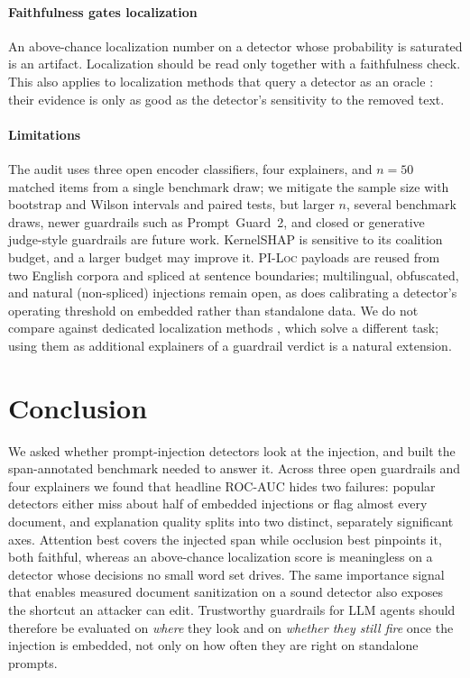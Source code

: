 \documentclass{ieeeaccess}
\begin{document}
\paragraph*{Faithfulness gates localization}
An above-chance localization number on a detector whose probability is saturated is an artifact. Localization should be read only together with a faithfulness check. This also applies to localization methods that query a detector as an oracle \cite{promptlocate2026}: their evidence is only as good as the detector's sensitivity to the removed text.

\paragraph*{Limitations}
The audit uses three open encoder classifiers, four explainers, and $n=50$ matched items from a single benchmark draw; we mitigate the sample size with bootstrap and Wilson intervals and paired tests, but larger $n$, several benchmark draws, newer guardrails such as Prompt~Guard~2, and closed or generative judge-style guardrails are future work. KernelSHAP is sensitive to its coalition budget, and a larger budget may improve it. \textsc{PI-Loc} payloads are reused from two English corpora and spliced at sentence boundaries; multilingual, obfuscated, and natural (non-spliced) injections remain open, as does calibrating a detector's operating threshold on embedded rather than standalone data. We do not compare against dedicated localization methods \cite{promptlocate2026,attnlocate2026}, which solve a different task; using them as additional explainers of a guardrail verdict is a natural extension.

\section{Conclusion}
\label{sec:conc}

We asked whether prompt-injection detectors look at the injection, and built the span-annotated benchmark needed to answer it. Across three open guardrails and four explainers we found that headline ROC-AUC hides two failures: popular detectors either miss about half of embedded injections or flag almost every document, and explanation quality splits into two distinct, separately significant axes. Attention best covers the injected span while occlusion best pinpoints it, both faithful, whereas an above-chance localization score is meaningless on a detector whose decisions no small word set drives. The same importance signal that enables measured document sanitization on a sound detector also exposes the shortcut an attacker can edit. Trustworthy guardrails for LLM agents should therefore be evaluated on \emph{where} they look and on \emph{whether they still fire} once the injection is embedded, not only on how often they are right on standalone prompts.
\end{document}

